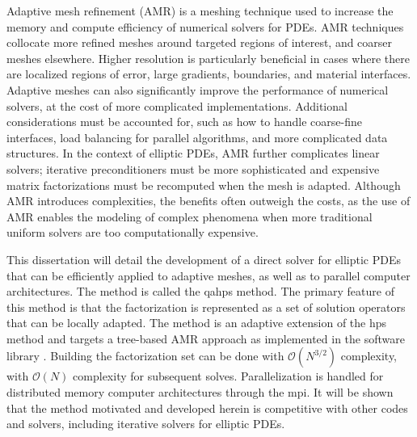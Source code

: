 Adaptive mesh refinement (AMR) is a meshing technique used to increase the memory and compute efficiency of numerical solvers for PDEs. AMR techniques collocate more refined meshes around targeted regions of interest, and coarser meshes elsewhere. Higher resolution is particularly beneficial in cases where there are localized regions of error, large gradients, boundaries, and material interfaces. Adaptive meshes can also significantly improve the performance of numerical solvers, at the cost of more complicated implementations. Additional considerations must be accounted for, such as how to handle coarse-fine interfaces, load balancing for parallel algorithms, and more complicated data structures. In the context of elliptic PDEs, AMR further complicates linear solvers; iterative preconditioners must be more sophisticated and expensive matrix factorizations must be recomputed when the mesh is adapted. Although AMR introduces complexities, the benefits often outweigh the costs, as the use of AMR enables the modeling of complex phenomena when more traditional uniform solvers are too computationally expensive.

This dissertation will detail the development of a direct solver for elliptic PDEs that can be efficiently applied to adaptive meshes, as well as to parallel computer architectures. The method is called the \gls{qahps} method. The primary feature of this method is that the factorization is represented as a set of solution operators that can be locally adapted. The method is an adaptive extension of the \gls{hps} method \citep{gillman2014direct} and targets a tree-based AMR approach as implemented in the \pforest software library \citep{burstedde2011p4est}. Building the factorization set can be done with $\mathcal{O}(N^{3/2})$ complexity, with $\mathcal{O}(N)$ complexity for subsequent solves. Parallelization is handled for distributed memory computer architectures through the \gls{mpi}. It will be shown that the method motivated and developed herein is competitive with other codes and solvers, including iterative solvers for elliptic PDEs.